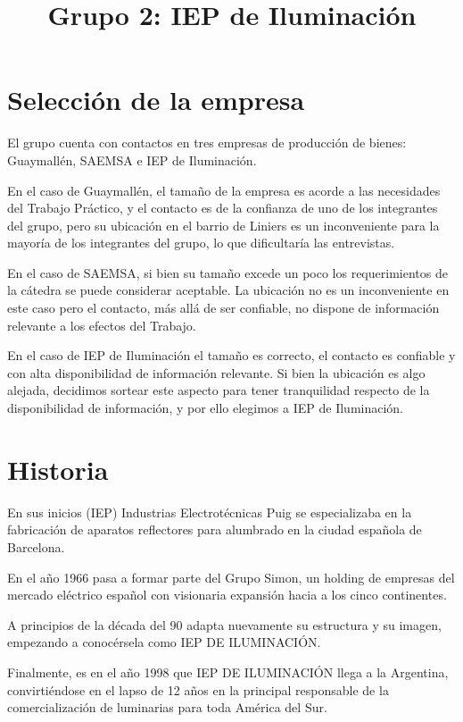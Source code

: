 \documentclass[12pt,titlepage]{article}
\begin{document}


\title{Grupo 2: IEP de Iluminaci\'on}
\author{}

\section{Selecci\'on de la empresa}
El grupo cuenta con contactos en tres empresas de producci\'on de bienes: Guaymall\'en, SAEMSA e IEP de Iluminaci\'on.

En el caso de Guaymall\'en, el tama\~no de la empresa es acorde a las necesidades del Trabajo Pr\'actico, y el contacto es de la confianza de uno de los integrantes del grupo, pero su ubicaci\'on en el barrio de Liniers es un inconveniente para la mayor\'ia de los integrantes del grupo, lo que dificultar\'ia las entrevistas.

En el caso de SAEMSA, si bien su tama\~no excede un poco los requerimientos de la c\'atedra se puede considerar aceptable. La ubicaci\'on no es un inconveniente en este caso pero el contacto, m\'as all\'a de ser confiable, no dispone de informaci\'on relevante a los efectos del Trabajo.

En el caso de IEP de Iluminaci\'on el tama\~no es correcto, el contacto es confiable y con alta disponibilidad de informaci\'on relevante. Si bien la ubicaci\'on es algo alejada, decidimos sortear este aspecto para tener tranquilidad respecto de la disponibilidad de informaci\'on, y por ello elegimos a IEP de Iluminaci\'on.

\section{Historia}
En sus inicios (IEP) Industrias Electrot\'ecnicas Puig  se especializaba en la fabricaci\'on de aparatos reflectores para alumbrado en la ciudad espa\~nola de Barcelona.

En el a\~no 1966 pasa a formar parte del Grupo Simon, un holding de empresas del mercado el\'ectrico espa\~nol con visionaria expansi\'on hacia a los cinco continentes.

A principios de la d\'ecada del 90 adapta nuevamente su estructura y su imagen, empezando a conoc\'ersela como IEP DE ILUMINACI\'ON.

Finalmente, es en el a\~no 1998 que IEP DE ILUMINACI\'ON llega a la Argentina, convirti\'endose en el lapso de 12 a\~nos en la principal responsable de la comercializaci\'on de luminarias para toda Am\'erica del Sur.
\end{document}
